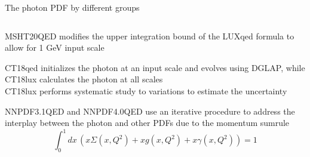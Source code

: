 \documentclass[aspectratio=169, 8pt,t]{beamer}
\begin{document}
\begin{frame}{The photon PDF by different groups}
  \begin{columns}
    \begin{column}{0.59\textwidth}


      \vspace*{1em}
      MSHT20QED modifies the upper integration bound of the LUXqed formula to allow for 1 GeV input scale

      \vspace*{1em}
      CT18qed initializes the photon at an input scale and evolves using DGLAP, while CT18lux calculates the photon at all scales\\

      \vspace*{0.5em}
      CT18lux performs systematic study to variations to estimate the uncertainty

      \vspace*{1em}
      NNPDF3.1QED and NNPDF4.0QED use an iterative procedure to address the interplay between the photon and other PDFs due to the momentum sumrule
      \begin{equation*}
        \int_0^1 dx\, \left(  x\Sigma(x,Q^2) + xg(x,Q^2) + x\gamma(x,Q^2) \right) =1
      \end{equation*}
    \end{column}


\end{columns}
\end{frame}
\end{document}
